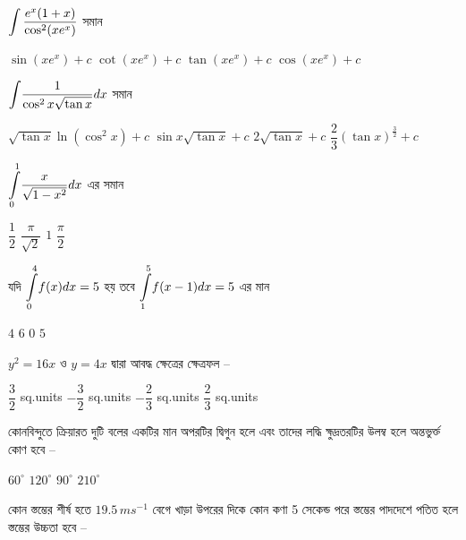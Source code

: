 \documentclass[addpoints]{exam}
\begin{document}
\begin{questions}
\question $ \mathlarger{\int \dfrac{e^{x}(1+x)}{\cos^{2}(xe^{x})}} $ সমান

\begin{oneparchoices}
\choice $ \sin (xe^{x}) +c $
\choice $ \cot (xe^{x}) +c $
\choice $ \tan (xe^{x}) +c $
\choice $ \cos (xe^{x}) +c$
\end{oneparchoices}

\question  $ \mathlarger{\int}\dfrac{1}{\cos^{2}x\sqrt{\tan x}}dx $ সমান

\begin{oneparchoices}
\choice $ \sqrt{\tan x}\ln (\cos^{2} x) + c $
\choice $ \sin x\sqrt{\tan x} + c $
\choice $ 2\sqrt{\tan x} + c $
\choice $ \dfrac{2}{3}(\tan x)^{\frac{3}{2}} + c $
\end{oneparchoices}

\question $ \mathlarger{\int\limits_{0}^{1}}\dfrac{x}{\sqrt{1-x^{2}}}dx $ এর সমান

\begin{oneparchoices}
\choice $ \dfrac{1}{2} $
\choice $ \dfrac{\pi}{\sqrt{2}} $
\choice $ 1 $
\choice $ \dfrac{\pi}{2} $ 
\end{oneparchoices}

\question যদি $ \mathlarger{\int\limits_{0}^{4}}f(x)dx = 5$  হয় তবে $ \mathlarger{\int\limits_{1}^{5}}f(x-1)dx = 5$  এর মান

\begin{oneparchoices}
\choice $ 4 $
\choice $ 6 $
\choice $ 0 $
\choice $ 5 $
\end{oneparchoices}

\question  $ y^{2}=16x $ ও $ y =4x $ দ্বারা আবদ্ধ ক্ষেত্রের ক্ষেত্রফল – 

\begin{oneparchoices}
\choice $ \dfrac{3}{2} $ sq.units
\choice $ -\dfrac{3}{2} $ sq.units
\choice $ -\dfrac{2}{3} $ sq.units
\choice $ \dfrac{2}{3} $ sq.units
\end{oneparchoices}

\question  কোনবিন্দুতে ক্রিয়ারত দুটি বলের একটির মান অপরটির দ্বিগুন হলে এবং তাদের লদ্ধি ক্ষুদ্রতরটির উলম্ব হলে অন্তভুর্ক্ত কোণ হবে –


\begin{oneparchoices}
\choice $ 60^{\circ} $
\choice $ 120^{\circ} $
\choice $ 90^{\circ} $
\choice  $ 210^{\circ} $
\end{oneparchoices}

 \question  কোন স্তম্ভের শীর্ষ হতে $ 19.5\,ms^{-1} $ বেগে খাড়া উপরের দিকে কোন কণা 5 সেকেন্ড পরে স্তম্ভের পাদদেশে পতিত হলে স্তম্ভের উচ্চতা হবে –


\end{questions}
\end{document}
